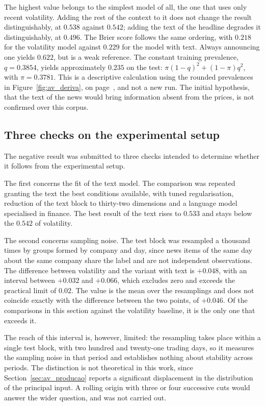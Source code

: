 The highest value belongs to the simplest model of all, the one that uses only recent volatility.
Adding the rest of the context to it does not change the result distinguishably, at $0.538$ against
$0.542$; adding the text of the headline degrades it distinguishably, at $0.496$. The Brier score
follows the same ordering, with $0.218$ for the volatility model against $0.229$ for the model with
text. Always announcing one yields $0.622$, but is a weak reference. The constant training
prevalence, $q=0.3854$, yields approximately $0.235$ on the test:
$\pi(1-q)^2+(1-\pi)q^2$, with $\pi=0.3781$. This is a descriptive calculation using the rounded
prevalences in Figure~\ref{fig:av_deriva}, on page~\pageref{fig:av_deriva}, and not a new run. The initial hypothesis, that the text of
the news would bring information absent from the prices, is not confirmed over this corpus.

\subsection{Three checks on the experimental setup}

The negative result was submitted to three checks intended to determine whether it follows from the
experimental setup.

The first concerns the fit of the text model. The comparison was repeated granting the text the
best conditions available, with tuned regularisation, reduction of the text block to thirty-two
dimensions and a language model specialised in finance. The best result of the text rises to
$0.533$ and stays below the $0.542$ of volatility.

The second concerns sampling noise. The test block was resampled a thousand times by groups formed
by company and day, since news items of the same day about the same company share the label and are
not independent observations. The difference between volatility and the variant with text is
$+0.048$, with an interval between $+0.032$ and $+0.066$, which excludes zero and exceeds the
practical limit of $0.02$. The value is the mean over the resamplings and does not coincide exactly
with the difference between the two points, of $+0.046$. Of the comparisons in this section against
the volatility baseline, it is the only one that exceeds it.

The reach of this interval is, however, limited: the resampling takes place within a single test
block, with two hundred and twenty-one trading days, so it measures the sampling noise in that
period and establishes nothing about stability across periods. The distinction is not theoretical
in this work, since Section~\ref{sec:av_producao} reports a significant displacement in the
distribution of the principal input. A rolling origin with three or four successive cuts would
answer the wider question, and was not carried out.


